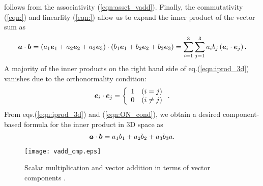 \documentclass[10pt,a4j]{article}
\begin{document}
follows from the associativity (\ref{eqn:assct_vadd}). Finally, the commutativity (\ref{eqn:}) and linearlity (\ref{eqn:}) allow us to expand the inner product of the vector sum as 
\begin{equation}
    \mbox{\boldmath $a$}\cdot\mbox{\boldmath $b$}=
    \left(a_1\mbox{\boldmath $e$}_1+ a_2\mbox{\boldmath $e$}_2+ a_3\mbox{\boldmath $e$}_3 \right)
    \cdot
    \left(b_1\mbox{\boldmath $e$}_1+ b_2\mbox{\boldmath $e$}_2+ b_3\mbox{\boldmath $e$}_3 \right) 
    =
    \sum_{i=1}^3\sum_{j=1}^3
    a_ib_j\left(\mbox{\boldmath $e$}_i\cdot\mbox{\boldmath $e$}_j\right).
    \label{eqn:iprod_3d}
\end{equation}
A majority of the inner products on the right hand side of eq.(\ref{eqn:iprod_3d}) vanishes due to the orthonormality condition: 
\begin{equation}
    \mbox{\boldmath $e$}_i\cdot\mbox{\boldmath $e$}_j=
    \left\{
        \begin{array}{cc}
            1 & (i=j) \\
            0 & (i\neq j)
        \end{array}
    \right.
    \label{eqn:ON_cond}.
\end{equation}
From eqs.(\ref{eqn:iprod_3d}) and (\ref{eqn:ON_cond}), we obtain a desired component-based formula for the inner product in 3D space as 
\begin{equation}
    \mbox{\boldmath $a$}\cdot\mbox{\boldmath $b$}= a_1b_1+a_2b_2+a_3b_3a.
    \label{eqn:}
\end{equation}
\begin{figure}[h]
    \begin{center}
    \texttt{[image: vadd\_cmp.eps]} 
    \end{center}
    \caption{Scalar multiplication and vector addition in terms of vector components .} 
    \label{fig:fig1_8}
\end{figure}
%
\end{document}
